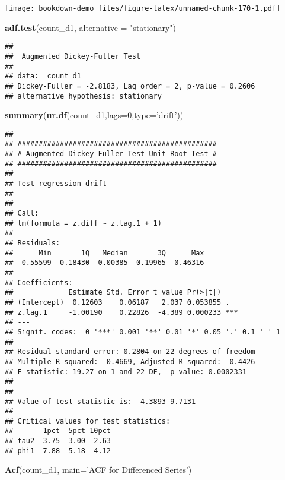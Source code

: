 \documentclass[]{book}
\newenvironment{Shaded}{\begin{snugshade}}{\end{snugshade}}
\newcommand{\KeywordTok}[1]{\textcolor[rgb]{0.13,0.29,0.53}{\textbf{#1}}}
\newcommand{\DataTypeTok}[1]{\textcolor[rgb]{0.13,0.29,0.53}{#1}}
\newcommand{\DecValTok}[1]{\textcolor[rgb]{0.00,0.00,0.81}{#1}}
\newcommand{\StringTok}[1]{\textcolor[rgb]{0.31,0.60,0.02}{#1}}
\newcommand{\NormalTok}[1]{#1}
\theoremstyle{definition}
\theoremstyle{definition}
\theoremstyle{definition}
\theoremstyle{remark}
\begin{document}
\texttt{[image: bookdown-demo\_files/figure-latex/unnamed-chunk-170-1.pdf]}

\begin{Shaded}
\begin{Highlighting}[]
\KeywordTok{adf.test}\NormalTok{(count_d1, }\DataTypeTok{alternative =} \StringTok{"stationary"}\NormalTok{)}
\end{Highlighting}
\end{Shaded}

\begin{verbatim}
## 
##  Augmented Dickey-Fuller Test
## 
## data:  count_d1
## Dickey-Fuller = -2.8183, Lag order = 2, p-value = 0.2606
## alternative hypothesis: stationary
\end{verbatim}

\begin{Shaded}
\begin{Highlighting}[]
\KeywordTok{summary}\NormalTok{(}\KeywordTok{ur.df}\NormalTok{(count_d1,}\DataTypeTok{lags=}\DecValTok{0}\NormalTok{,}\DataTypeTok{type=}\StringTok{'drift'}\NormalTok{))}
\end{Highlighting}
\end{Shaded}

\begin{verbatim}
## 
## ############################################### 
## # Augmented Dickey-Fuller Test Unit Root Test # 
## ############################################### 
## 
## Test regression drift 
## 
## 
## Call:
## lm(formula = z.diff ~ z.lag.1 + 1)
## 
## Residuals:
##      Min       1Q   Median       3Q      Max 
## -0.55599 -0.18430  0.00385  0.19965  0.46316 
## 
## Coefficients:
##             Estimate Std. Error t value Pr(>|t|)    
## (Intercept)  0.12603    0.06187   2.037 0.053855 .  
## z.lag.1     -1.00190    0.22826  -4.389 0.000233 ***
## ---
## Signif. codes:  0 '***' 0.001 '**' 0.01 '*' 0.05 '.' 0.1 ' ' 1
## 
## Residual standard error: 0.2804 on 22 degrees of freedom
## Multiple R-squared:  0.4669, Adjusted R-squared:  0.4426 
## F-statistic: 19.27 on 1 and 22 DF,  p-value: 0.0002331
## 
## 
## Value of test-statistic is: -4.3893 9.7131 
## 
## Critical values for test statistics: 
##       1pct  5pct 10pct
## tau2 -3.75 -3.00 -2.63
## phi1  7.88  5.18  4.12
\end{verbatim}

\begin{Shaded}
\begin{Highlighting}[]
\KeywordTok{Acf}\NormalTok{(count_d1, }\DataTypeTok{main=}\StringTok{'ACF for Differenced Series'}\NormalTok{)}
\end{Highlighting}
\end{Shaded}
\end{document}
